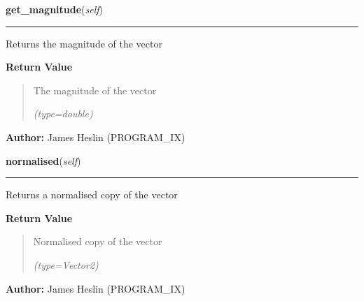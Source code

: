     \vspace{0.5ex}

\hspace{.8\funcindent}\begin{boxedminipage}{\funcwidth}

    \raggedright \textbf{get\_magnitude}(\textit{self})

    \vspace{-1.5ex}

    \rule{\textwidth}{0.5\fboxrule}
\setlength{\parskip}{2ex}
    Returns the magnitude of the vector

\setlength{\parskip}{1ex}
      \textbf{Return Value}
    \vspace{-1ex}

      \begin{quote}
      The magnitude of the vector

      {\it (type=double)}

      \end{quote}

\textbf{Author:} James Heslin (PROGRAM\_IX)



    \end{boxedminipage}

    \label{pystroke:vector2:Vector2:normalised}

    \vspace{0.5ex}

\hspace{.8\funcindent}\begin{boxedminipage}{\funcwidth}

    \raggedright \textbf{normalised}(\textit{self})

    \vspace{-1.5ex}

    \rule{\textwidth}{0.5\fboxrule}
\setlength{\parskip}{2ex}
    Returns a normalised copy of the vector

\setlength{\parskip}{1ex}
      \textbf{Return Value}
    \vspace{-1ex}

      \begin{quote}
      Normalised copy of the vector

      {\it (type=Vector2)}

      \end{quote}

\textbf{Author:} James Heslin (PROGRAM\_IX)



    \end{boxedminipage}


